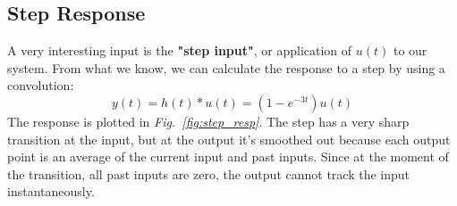 \subsection{Step Response}
A very interesting input is the \textbf{"step input"}, or application of $u(t)$ to our system.  From what we know, we can calculate the response to a step by using a convolution:
    \begin{equation}
        y(t) = h(t) * u(t) = \left( 1 - e^{-3 t} \right) u(t) 
    \end{equation}
The response is plotted in \emph{Fig.~\ref{fig:step_resp}}. The step has a very sharp transition at the input, but at the output it's smoothed out because each output point is an average of the current input and past inputs.  Since at the moment of the transition, all past inputs are zero, the output cannot track the input instantaneously.
\newpage
